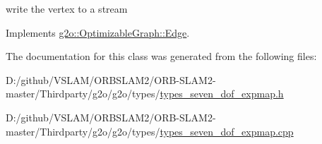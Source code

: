 write the vertex to a stream 



Implements \mbox{\hyperlink{classg2o_1_1_optimizable_graph_1_1_edge_a804b9a2178249b9297c55b8fbbeda56e}{g2o\+::\+Optimizable\+Graph\+::\+Edge}}.



The documentation for this class was generated from the following files\+:\begin{DoxyCompactItemize}
\item 
D\+:/github/\+V\+S\+L\+A\+M/\+O\+R\+B\+S\+L\+A\+M2/\+O\+R\+B-\/\+S\+L\+A\+M2-\/master/\+Thirdparty/g2o/g2o/types/\mbox{\hyperlink{types__seven__dof__expmap_8h}{types\+\_\+seven\+\_\+dof\+\_\+expmap.\+h}}\item 
D\+:/github/\+V\+S\+L\+A\+M/\+O\+R\+B\+S\+L\+A\+M2/\+O\+R\+B-\/\+S\+L\+A\+M2-\/master/\+Thirdparty/g2o/g2o/types/\mbox{\hyperlink{types__seven__dof__expmap_8cpp}{types\+\_\+seven\+\_\+dof\+\_\+expmap.\+cpp}}\end{DoxyCompactItemize}
